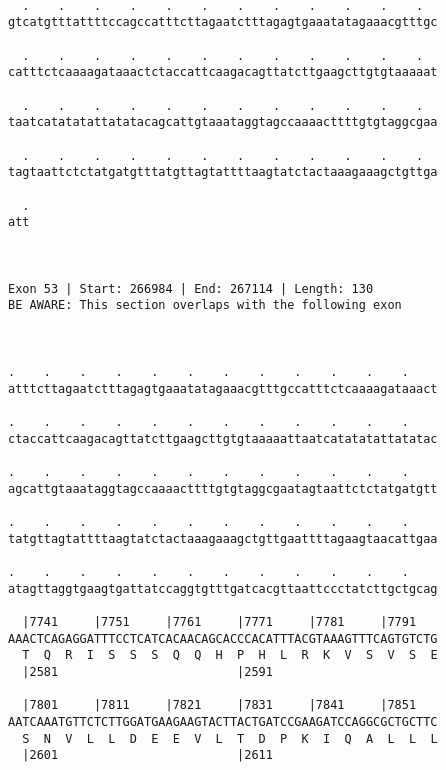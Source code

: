\documentclass{article}
\begin{document}
\begin{Verbatim}
  
  .    .    .    .    .    .    .    .    .    .    .    .  
gtcatgtttattttccagccatttcttagaatctttagagtgaaatatagaaacgtttgc
                                                            
  .    .    .    .    .    .    .    .    .    .    .    .  
catttctcaaaagataaactctaccattcaagacagttatcttgaagcttgtgtaaaaat
                                                            
  .    .    .    .    .    .    .    .    .    .    .    .  
taatcatatatattatatacagcattgtaaataggtagccaaaacttttgtgtaggcgaa
                                                            
  .    .    .    .    .    .    .    .    .    .    .    .  
tagtaattctctatgatgtttatgttagtattttaagtatctactaaagaaagctgttga
                                                            
  .
att
   
   
 
Exon 53 | Start: 266984 | End: 267114 | Length: 130
BE AWARE: This section overlaps with the following exon



.    .    .    .    .    .    .    .    .    .    .    .    
atttcttagaatctttagagtgaaatatagaaacgtttgccatttctcaaaagataaact
                                                            
.    .    .    .    .    .    .    .    .    .    .    .    
ctaccattcaagacagttatcttgaagcttgtgtaaaaattaatcatatatattatatac
                                                            
.    .    .    .    .    .    .    .    .    .    .    .    
agcattgtaaataggtagccaaaacttttgtgtaggcgaatagtaattctctatgatgtt
                                                            
.    .    .    .    .    .    .    .    .    .    .    .    
tatgttagtattttaagtatctactaaagaaagctgttgaattttagaagtaacattgaa
                                                            
.    .    .    .    .    .    .    .    .    .    .    .    
atagttaggtgaagtgattatccaggtgtttgatcacgttaattccctatcttgctgcag
                                                            
  |7741     |7751     |7761     |7771     |7781     |7791   
AAACTCAGAGGATTTCCTCATCACAACAGCACCCACATTTACGTAAAGTTTCAGTGTCTG
  T  Q  R  I  S  S  S  Q  Q  H  P  H  L  R  K  V  S  V  S  E
  |2581                         |2591                       
  
  |7801     |7811     |7821     |7831     |7841     |7851   
AATCAAATGTTCTCTTGGATGAAGAAGTACTTACTGATCCGAAGATCCAGGCGCTGCTTC
  S  N  V  L  L  D  E  E  V  L  T  D  P  K  I  Q  A  L  L  L
  |2601                         |2611                       
  

\end{Verbatim}
\end{document}
